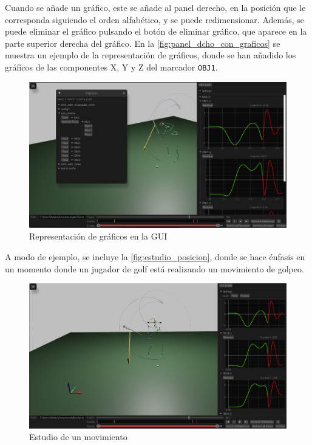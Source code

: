 Cuando se añade un gráfico, este se añade al panel derecho, en la posición que le corresponda siguiendo el orden alfabético, y se puede redimensionar. 
Además, se puede eliminar el gráfico pulsando el botón de eliminar gráfico, que aparece en la parte superior derecha del gráfico. En la \autoref{fig:panel_dcho_con_graficos} se muestra un ejemplo de la representación de gráficos, donde se han añadido los gráficos de las componentes X, Y y Z del marcador \texttt{OBJ1}. 

\begin{figure}[H]
  \centering
  \includegraphics[width=\textwidth]{imagenes/graficos.png}
  \caption{Representación de gráficos en la \acs{GUI}}
  \label{fig:panel_dcho_con_graficos}
\end{figure}

A modo de ejemplo, se incluye la \autoref{fig:estudio_posicion}, donde se hace énfasis en un momento donde un jugador de golf está realizando un movimiento de golpeo.

\begin{figure}[H]
  \centering
  \includegraphics[width=\textwidth]{imagenes/estudio_posicion.png}
  \caption{Estudio de un movimiento}
  \label{fig:estudio_posicion}
\end{figure}

